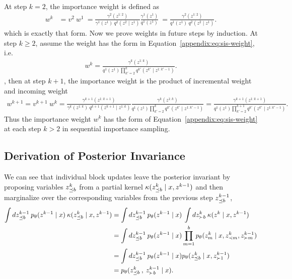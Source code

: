 \documentclass[anonymous=false, %
               format=acmsmall, %
               review=true, %
               screen=true, %
               nonacm=true]{acmart}
\theoremstyle{definition}
\begin{document}
At step $k=2$, the importance weight is defined as 
\begin{align*}
    w^k 
    &= 
    v^{2} \: w^1
    \: =
    \frac{\gamma^2(z^{1:2})}{\gamma^{1}(z^{1})\:q^2(z^2 \mid z^{1})} \frac{\gamma^1(z^1)}{q^1(z^1)}
    \: = \frac{\gamma^2(z^{1:2})}{q^1(z^1) \: q^2(z^2 \mid z^{1})}.
\end{align*}
which is exactly that form. Now we prove weights in future steps by induction. At step $k\geq 2$, assume the weight has the form in Equation~\ref{appendix:eq:sis-weight}, i.e.
\begin{align*}
    w^k
    = 
    \frac{\gamma^k(z^{1:k})}
         {q^1(z^1) \prod_{k'=2}^k q^{k'}(z^{k'} \mid z^{1:k'-1})}.    
\end{align*}
, then at step $k+1$, the importance weight is the product of incremental weight and incoming weight 
\begin{align*}
    w^{k+1}
    =
    v^{k+1} \: w^k
    =
    \frac{\gamma^{k+1}(z^{1:k+1})}{\gamma^{k}(z^{1:k})\:q^{k+1}(z^{k+1} \mid z^{1:k})}
    \frac{\gamma^k(z^{1:k})}
         {q^1(z^1) \prod_{k'=2}^k q^{k'}(z^{k'} \mid z^{1:k'-1})}
    =
    \frac{\gamma^{k+1}(z^{1:k+1})}{q^1(z^1) \prod_{k'=2}^{k+1} q^{k'}(z^{k'} \mid z^{1:k'-1})}
    .    
\end{align*}
Thus the importance weight $w^k$ has the form of Equation~\ref{appendix:eq:sis-weight} at each step $k>2$ in sequential importance sampling.
\subsection{Derivation of Posterior Invariance}
\label{appendix:posterior-invariance}
We can see that individual block updates leave the posterior invariant by proposing variables $z^k_{\preceq b}$ from a partial kernel $\kappa(z^k_{\preceq b} \mid x, z^{k-1})$ and then marginalize over the corresponding variables from the previous step $z^{k-1}_{\preceq b}$,
\begin{align*}
    \int 
    dz^{k-1}_{\preceq b} 
    \:
    p_\theta(z^{k-1} \mid x) 
    \: 
    \kappa(z^k_{\preceq b} \mid x, z^{k-1}) 
    &=
    \int 
    dz^{k-1}_{\preceq b} 
    \:
    p_\theta(z^{k-1} \mid x) 
    \: 
    \int dz^k_{\succ b}
    \:
    \kappa(z^k \mid x, z^{k-1})
    \\
    &= 
    \int 
    dz^{k-1}_{\preceq b} 
    \: 
    p_\theta(z^{k-1} \mid x)
    \prod_{m=1}^b p_\theta(z^k_m \mid x, z^{k}_{\prec m}, z^{k-1}_{\succ m})
    \\
    &=
    \int 
    dz^{k-1}_{\preceq b} 
    \: 
    p_\theta(z^{k-1} \mid x)
    p_\theta(z^k_{\preceq b} \mid x, z^{k-1}_{\succ 1})
    \\
    &=
    p_\theta(z^k_{\preceq b}\:, \: z^{k-1}_{\succ b} \mid x)
    .
\end{align*}
\end{document}
